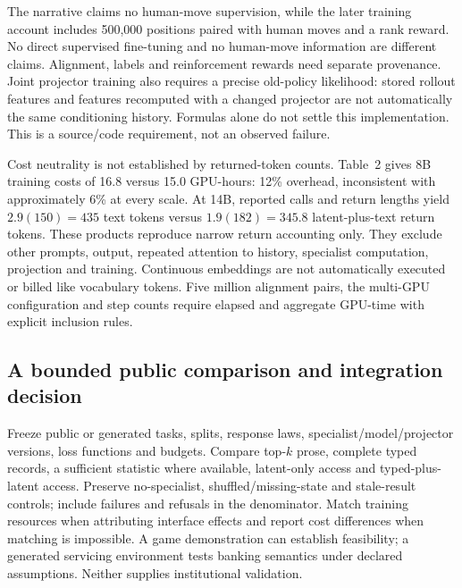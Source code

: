 The narrative claims no human-move supervision, while the later training account includes 500,000 positions paired with human moves and a rank reward. No direct supervised fine-tuning and no human-move information are different claims. Alignment, labels and reinforcement rewards need separate provenance. Joint projector training also requires a precise old-policy likelihood: stored rollout features and features recomputed with a changed projector are not automatically the same conditioning history. Formulas alone do not settle this implementation. This is a source/code requirement, not an observed failure.~\citep{exec24_collaboration_original}

Cost neutrality is not established by returned-token counts. Table~2 gives 8B training costs of 16.8 versus 15.0 GPU-hours: 12\% overhead, inconsistent with approximately 6\% at every scale. At 14B, reported calls and return lengths yield $2.9(150)=435$ text tokens versus $1.9(182)=345.8$ latent-plus-text return tokens. These products reproduce narrow return accounting only. They exclude other prompts, output, repeated attention to history, specialist computation, projection and training. Continuous embeddings are not automatically executed or billed like vocabulary tokens. Five million alignment pairs, the multi-GPU configuration and step counts require elapsed and aggregate GPU-time with explicit inclusion rules.~\citep{exec24_collaboration_original,exec24_collaboration_reference}

\subsection{A bounded public comparison and integration decision}
Freeze public or generated tasks, splits, response laws, specialist/model/projector versions, loss functions and budgets. Compare top-$k$ prose, complete typed records, a sufficient statistic where available, latent-only access and typed-plus-latent access. Preserve no-specialist, shuffled/missing-state and stale-result controls; include failures and refusals in the denominator. Match training resources when attributing interface effects and report cost differences when matching is impossible. A game demonstration can establish feasibility; a generated servicing environment tests banking semantics under declared assumptions. Neither supplies institutional validation.~\citep{exec24_collaboration_original,exec24_collaboration_reference}

